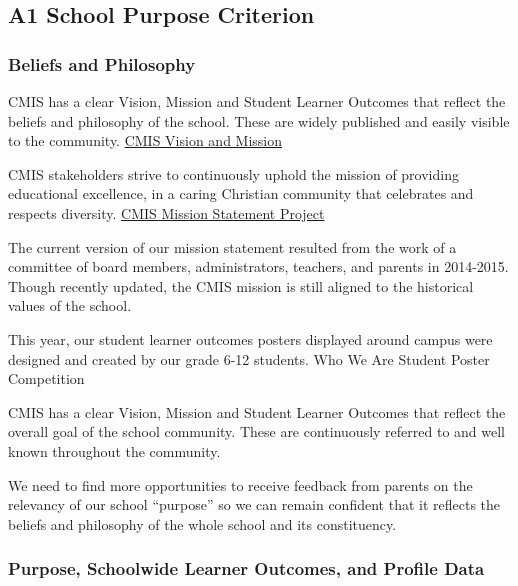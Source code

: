 \subsection{A1 School Purpose Criterion}
\subsubsection{Beliefs and Philosophy}



\begin{findings}
CMIS has a clear Vision, Mission and Student Learner Outcomes that reflect the beliefs and philosophy of the school. These are widely published and easily visible to the community. \href{http://cmis.ac.th/about/vision}{CMIS Vision and Mission} 

CMIS stakeholders strive to continuously uphold the mission of providing educational excellence, in a caring Christian community that celebrates and respects diversity. \href{https://docs.google.com/a/cmis.ac.th/presentation/d/1EJ3zT-xwUj2W--v5mTN6xWOqewtvhXrhTxXuoR1HyAg/edit?usp=sharing}{CMIS Mission Statement Project} 

The current version of our mission statement resulted from the work of a committee of board members, administrators, teachers, and parents in 2014-2015. Though recently updated, the CMIS mission is still aligned to the historical values of the school.

This year, our student learner outcomes posters displayed around campus were designed and created by our grade 6-12 students. Who We Are Student Poster Competition 


CMIS has a clear Vision, Mission and Student Learner Outcomes that reflect the overall goal of the school community. These are continuously referred to and well known throughout the community. 

We need to find more opportunities to receive feedback from parents on the relevancy of our school “purpose” so we can remain confident that it reflects the beliefs and philosophy of the whole school and its constituency.
\end{findings}

\subsubsection{Purpose, Schoolwide Learner Outcomes, and Profile Data}

